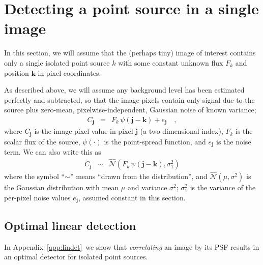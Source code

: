 \documentclass[letterpaper,preprint]{aastex}
\newcommand{\appref}[1]{\mbox{Appendix~\ref{#1}}}
\newcommand{\drawnfrom}{\sim}
\newcommand{\gaussianN}{\mathcal{N}}
\newcommand{\gaussx}[1]{\hat{\gaussianN}\!\left(#1\right)}
\newcommand{\noise}{e}
\renewcommand{\vec}[1]{\boldsymbol{#1}}
\newcommand{\jvec}{\vec{j}}
\newcommand{\kvec}{\vec{k}}
\begin{document}
\section{Detecting a point source in a single image}

In this section, we will assume that the (perhaps tiny) image of
interest contains only a single isolated point source $k$ with some
constant unknown flux $F_k$ and position $\kvec$ in pixel coordinates.

As described above, we will assume any background level has been
estimated perfectly and subtracted, so that the image pixels contain
only signal due to the source plus zero-mean, pixelwise-independent,
Gaussian noise of known variance;
\begin{eqnarray}\displaystyle
  C_{\jvec} &=& F_k \, \psi(\jvec - \kvec)  + \noise_{\jvec} \quad ,
\end{eqnarray}
where $C_{\jvec}$ is the image pixel value in pixel $\jvec$ (a
two-dimensional index), $F_k$ is the scalar flux of the source,
$\psi(\cdot)$ is the point-spread function, and $\noise_{\jvec}$ is
the noise term.  We can also write this as
\begin{eqnarray}\displaystyle
  C_{\jvec} &\drawnfrom& \gaussx{F_k \, \psi(\jvec - \kvec), \sigma_1^2}
\label{eq:modelimg}
\end{eqnarray}
where the symbol ``$\drawnfrom$'' means ``drawn from the
distribution'', and $\gaussx{\mu,\sigma^2}$ is the Gaussian
distribution with mean $\mu$ and variance $\sigma^2$; $\sigma_1^2$ is
the variance of the per-pixel noise values $\noise_{\jvec}$, assumed
constant in this section.







\subsection{Optimal linear detection}

In \appref{app:lindet}\ we show that \emph{correlating} an image by
its PSF results in an optimal detector for isolated point sources.
\end{document}
